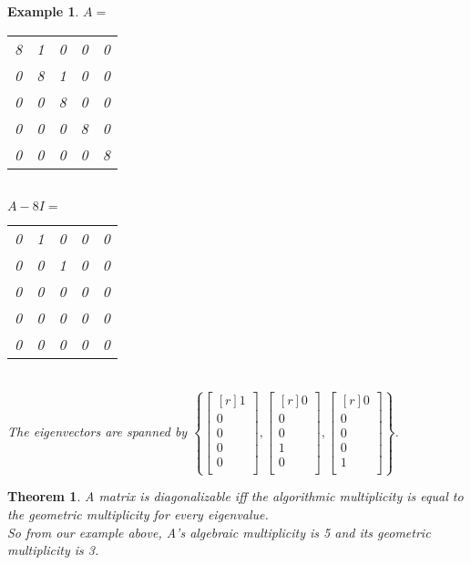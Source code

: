 \documentclass{report}
\newtheorem*{ex}{Example}
\newtheorem*{thrm}{Theorem}
\begin{document}
\begin{ex}
$A=$
\begin{tabular}{ccc|c|c}
8&1&0&0&0\\
0&8&1&0&0\\
0&0&8&0&0\\
\hline
0&0&0&8&0\\
\hline
0&0&0&0&8\\
\end{tabular}\\
$A-8I =$
\begin{tabular}{ccc|c|c}
0&1&0&0&0\\
0&0&1&0&0\\
0&0&0&0&0\\
\hline
0&0&0&0&0\\
\hline
0&0&0&0&0\\
\end{tabular}\\
The eigenvectors are spanned by $\left\{ \begin{bmatrix}[r]1\\0\\0\\0\\0\\\end{bmatrix},\begin{bmatrix}[r]0\\0\\0\\1\\0\\\end{bmatrix},\begin{bmatrix}[r]0\\0\\0\\0\\1\\\end{bmatrix}\right\}$.
\end{ex}
\begin{thrm}
A matrix is diagonalizable iff the algorithmic multiplicity is equal to the geometric multiplicity for every eigenvalue.\\
So from our example above, A's algebraic multiplicity is 5 and its geometric multiplicity is 3.
\end{thrm}
\end{document}
